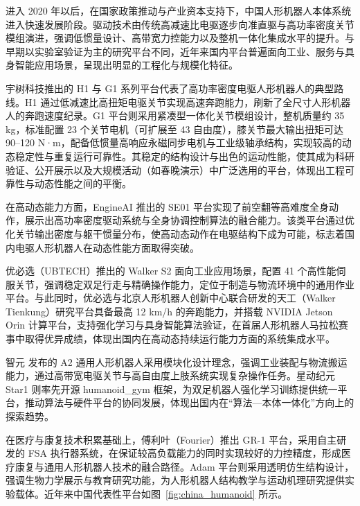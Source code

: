 进入 2020 年以后，在国家政策推动与产业资本支持下，中国人形机器人本体系统进入快速发展阶段。驱动技术由传统高减速比电驱逐步向准直驱与高功率密度关节模组演进，强调低惯量设计、高带宽力控能力以及整机一体化集成水平的提升。与早期以实验室验证为主的研究平台不同，近年来国内平台普遍面向工业、服务与具身智能应用场景，呈现出明显的工程化与规模化特征。

宇树科技推出的 H1 与 G1 系列平台代表了高功率密度电驱人形机器人的典型路线。H1 通过低减速比高扭矩电驱关节实现高速奔跑能力，刷新了全尺寸人形机器人的奔跑速度纪录。G1 平台则采用紧凑型一体化关节模组设计，整机质量约 35 kg，标准配置 23 个关节电机（可扩展至 43 自由度）\cite{Unitree2024G1}，膝关节最大输出扭矩可达 90--120 N·m，配备低惯量高响应永磁同步电机与工业级轴承结构，实现较高的动态稳定性与重复运行可靠性。其稳定的结构设计与出色的运动性能，使其成为科研验证、公开展示以及大规模活动（如春晚演示）中广泛选用的平台，体现出工程可靠性与动态性能之间的平衡。

在高动态能力方面，EngineAI 推出的 SE01 平台实现了前空翻等高难度全身动作，展示出高功率密度驱动系统与全身协调控制算法的融合能力。该类平台通过优化关节输出密度与躯干惯量分布，使高动态动作在电驱结构下成为可能，标志着国内电驱人形机器人在动态性能方面取得突破\cite{EngineAI2024SE01}。

优必选（UBTECH）推出的 Walker S2 面向工业应用场景\cite{UBTECH2024WalkerS2}，配置 41 个高性能伺服关节，强调稳定双足行走与精确操作能力，定位于制造与物流环境中的通用作业平台。与此同时，优必选与北京人形机器人创新中心联合研发的天工（Walker Tienkung）研究平台具备最高 12 km/h 的奔跑能力，并搭载 NVIDIA Jetson Orin 计算平台，支持强化学习与具身智能算法验证，在首届人形机器人马拉松赛事中取得优异成绩，体现出国内在高动态持续运行能力方面的系统集成水平\cite{UBTECH2024Tienkung}。

智元 发布的 A2 通用人形机器人采用模块化设计理念，强调工业装配与物流搬运能力，通过高带宽电驱关节与高自由度上肢系统实现复杂操作任务\cite{Fourier2024GR1}。星动纪元 Star1 则率先开源 humanoid\_gym 框架，为双足机器人强化学习训练提供统一平台，推动算法与硬件平台的协同发展，体现出国内在“算法—本体一体化”方向上的探索趋势。

在医疗与康复技术积累基础上，傅利叶（Fourier）推出 GR-1 平台，采用自主研发的 FSA 执行器系统，在保证较高负载能力的同时实现较好的力控精度，形成医疗康复与通用人形机器人技术的融合路径。Adam 平台则采用透明仿生结构设计，强调生物力学展示与教育研究功能，为人形机器人结构教学与运动机理研究提供实验载体。近年来中国代表性平台如图~\ref{fig:china_humanoid} 所示。


